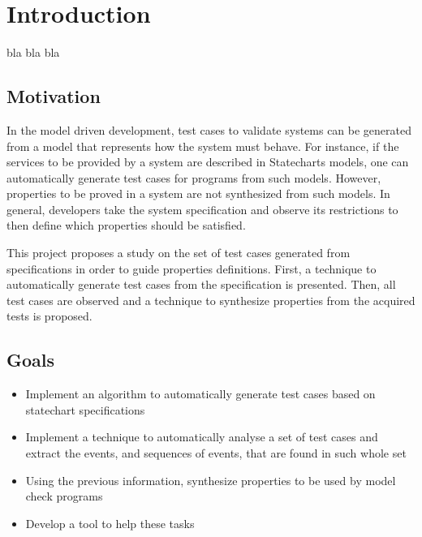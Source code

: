 \chapter{Introduction}
\label{cap:introducao}

bla bla bla

\section{Motivation}

In the model driven development, test cases to validate systems can be generated from a model that represents how the system must behave. For instance, if the services to be provided by a system are described in Statecharts models, one can  automatically generate test cases for programs from such models. However, properties to be proved in a system are not synthesized from such models. In general, developers take the system specification and observe its restrictions to then define which properties should be satisfied. 


This project proposes a study on the set of test cases generated from specifications in order to guide properties definitions. First, a technique to automatically generate test cases from the specification is presented. Then, all test cases are observed and a technique to synthesize properties from the acquired tests is proposed.

\section{Goals}

\begin{itemize}

\item Implement an algorithm to automatically generate test cases based on statechart specifications

\item Implement a technique to automatically analyse a set of test cases and extract the events, and sequences of events, that are found in such whole set

\item Using the previous information, synthesize properties to be used by model check programs 

\item Develop a tool to help these tasks

\end{itemize}

